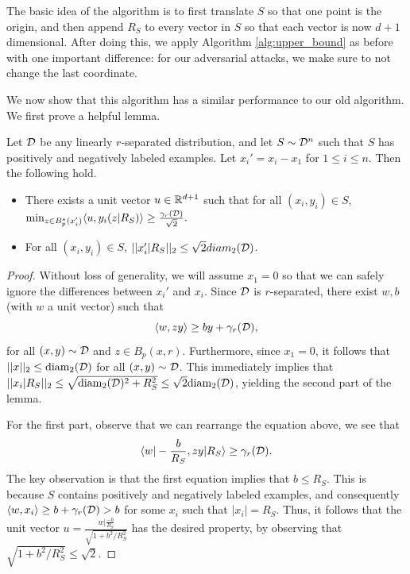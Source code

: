 The basic idea of the algorithm is to first translate $S$ so that one point is the origin, and then append $R_S$ to every vector in $S$ so that each vector is now $d+1$ dimensional. After doing this, we apply Algorithm \ref{alg:upper_bound} as before with one important difference: for our adversarial attacks, we make sure to not change the last coordinate. 

We now show that this algorithm has a similar performance to our old algorithm. We first prove a helpful lemma.

\begin{lem}\label{lem:general_upper_bound}
Let ${\mathcal D}$ be any linearly $r$-separated distribution, and let $S \sim {\mathcal D}^n$ such that $S$ has positively and negatively labeled examples. Let $x_i' = x_i - x_1$ for $1 \leq i \leq n$. Then the following hold.
\begin{itemize}
	\item There exists a unit vector $u \in \mathbb R^{d+1}$ such that for all $(x_i, y_i) \in S$, $\min_{z \in B_p^*(x_i')} \langle u, y_i(z|R_S) \rangle \geq \frac{\gamma_r({\mathcal D})}{\sqrt{2}}.$
	\item For all $(x_i, y_i) \in S$, $||x_i'|R_S||_2 \leq \sqrt{2}diam_2({\mathcal D})$. 
\end{itemize}
\end{lem}

\begin{proof}
Without loss of generality, we will assume $x_1 = 0$ so that we can safely ignore the differences between $x_i'$ and $x_i$. Since ${\mathcal D}$ is $r$-separated, there exist $w, b$ (with $w$ a unit vector) such that $$\langle w, zy \rangle \geq by + \gamma_r({\mathcal D}),$$ for all $(x,y) \sim {\mathcal D}$ and $z \in B_p(x, r)$. Furthermore, since $x_1 = 0$, it follows that $||x||_2 \leq \text{diam}_2({\mathcal D})$ for all $(x, y) \sim {\mathcal D}$. This immediately implies that $||x_i|R_S||_2 \leq \sqrt{\text{diam}_2({\mathcal D})^2 + R_S^2} \leq \sqrt{2}\text{diam}_2({\mathcal D})$, yielding the second part of the lemma.

For the first part, observe that we can rearrange the equation above, we see that $$\langle w|-\frac{b}{R_S}, zy | R_S \rangle \geq \gamma_r({\mathcal D}).$$ The key observation is that the first equation implies that $b \leq R_S$. This is because $S$ contains positively and negatively labeled examples, and consequently $\langle w, x_i \rangle \geq b + \gamma_r({\mathcal D}) > b$ for some $x_i$ such that $|x_i| = R_S$. Thus, it follows that the unit vector $u = \frac{w|\frac{-b}{R_S}}{\sqrt{1 + b^2/R_S^2}}$ has the desired property, by observing that $\sqrt{1 + b^2/R_S^2} \leq \sqrt{2}$. 
\end{proof}


